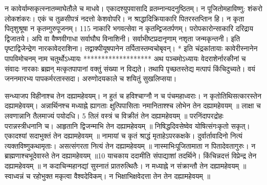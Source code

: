 न कावेर्याम्सकृत्स्नातम्माघेतौले च माधवे।
 एकादश्युपवासादि व्रतम्नान्यदनुष्ठितम्।
 न पूजितोमहाविष्णु: शंकरो लोकशंकरः।
 एकं च तुळसीपत्रं नदत्तो केशवोपरि।
 न श्राद्धादिक्रियाकारि पितरस्तप्तिान हि।
 न कृता पितृशुश्रूषा न कृतम्गुरुपूजनम्।
 115 नाकारि भगवत्सेवा न कृतम्द्विजतर्पणम्।
 परोपकारोन्साकारि दरिद्राय द्विजातये।
 अपि वा वैष्णवीगाधा सर्वाघौघ विनाशिनी।
 सर्वाभीष्टप्रदानृणाम् नशृता जन्मकृन्तनी।
 इति पृष्टाद्विजेन्द्रेण नारकावेदराशिना।
 तद्वाक्पीयूषपानेन तर्पितास्तम्वचोबृवन्।
 * इति चंद्रकांतायाः कावेरीस्नानेन पापविमोचनम् नाम
चतुर्थोऽध्यायः
*******************
अथ पञ्चमोऽध्यायः वेदराशेर्नारकीनां च संवादः
नारकाः
ब्रह्मन् मत्कृतपापानां वक्तुं संख्या न विद्यते।
 तथापि पृच्छतस्तेद्य मत्पापं किंचिदुच्यते।
 वयं जननमारभ्य पापकर्मरतास्सदा।
 अरुणोदयकाले च शयितुं सुखलिप्सया।
 


सन्ध्याजप विहीनाश्च तेन दह्यामहेवयम्।
 न हुतं च हविश्चाग्नौ न च पंचमहाध्वराः।
 न कृतोतिथिसत्कारस्तेन दह्यामहेवयम्।
 अन्नार्थिनश्च मध्याह्ने ह्यागताः क्षुत्पिपासिताः नमानिताश्श्च लोभेन तेन दह्यामहेवयम् ॥ लाक्षा च लवणान्नानि तैलमाज्यं पयोदधि।
 5 तिलं वस्त्रं च विक्रीतं तेन दह्यामहेवयम् ॥ परनिंदापरद्रोहः परान्नस्त्रीधनानि च।
 आहृतानि द्विजन्माभि तेन दह्यामहेवयम् ॥ निषिद्धदिवसेष्वेव योषित्संगःकृतो सकृत्।
 एकादश्यां सदाभुक्तं तेन दह्यामहेवयम् ॥ नामायां च कृतं श्राद्धं मृताहेऽपरकक्षके।
 दुर्वार्तावादिनो नित्यं त्यक्तविष्णुकथामृताः।
 असत्संगरता नित्यं तेन दह्यामहेवयम् ॥ नास्माभिःपूजितामाता न पितादेवतागुरुः।
 न ब्राह्मणाश्चभूदेवास्ते तेन दह्यामहेवयम् ॥10 याचकाय ददामीति संपाद्याशां तदर्थिने।
 किंचिन्नदत्तं विप्रेन्द्र तेन दह्यामहेवयम् ॥ न कदाचिन्महानद्यां सुस्नातं प्रातरुत्थितैः।
 न मध्याह्ने न संक्रान्तौ तेन दह्यामहेवयम् ॥ स्वाध्वन्नं च रहोभुक्त मकृत्वा वैश्वदेविकम्।
 न भिक्षाभिक्षवेदत्ता तेन तेन दह्यामहेवयम् ॥

